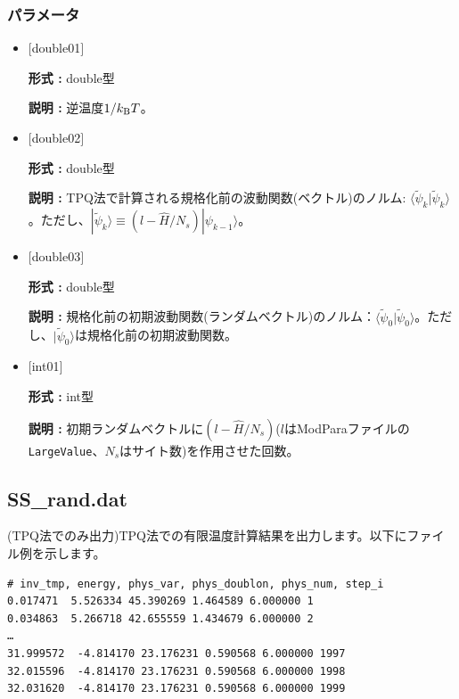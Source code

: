 \subsubsection{パラメータ}
 \begin{itemize}

  \item  $[$double01$]$
  
 {\bf 形式 :} double型

{\bf 説明 :} 逆温度$1/{k_{\rm B}T}$。
 
  \item $[$double02$]$

 {\bf 形式 :} double型 

{\bf 説明 :}  TPQ法で計算される規格化前の波動関数(ベクトル)のノルム:
 $\langle \tilde{\psi}_{k} |\tilde{\psi}_{k}\rangle$。ただし、$|\tilde{\psi}_{k}\rangle \equiv(l-\hat{H}/N_{s})|\psi_{k-1}\rangle$。

  \item $[$double03$]$

 {\bf 形式 :} double型 

{\bf 説明 :} 規格化前の初期波動関数(ランダムベクトル)のノルム：$\langle \tilde{\psi}_{0} |\tilde{\psi}_{0}\rangle$。ただし、$|\tilde{\psi}_{0}\rangle$は規格化前の初期波動関数。

  \item $[$int01$]$

 {\bf 形式 :} int型 

{\bf 説明 :} 初期ランダムベクトルに$(l-\hat{H}/N_{s})$($l$はModParaファイルの\verb|LargeValue|、$N_{s}$はサイト数)を作用させた回数。

 \end{itemize}


\newpage
\subsection{SS\_rand.dat}
\label{Subsec:ssrand}
(TPQ法でのみ出力)TPQ法での有限温度計算結果を出力します。以下にファイル例を示します。\\
\begin{minipage}{15cm}
\begin{screen}
\begin{verbatim}
# inv_tmp, energy, phys_var, phys_doublon, phys_num, step_i
0.017471  5.526334 45.390269 1.464589 6.000000 1
0.034863  5.266718 42.655559 1.434679 6.000000 2
…
31.999572  -4.814170 23.176231 0.590568 6.000000 1997
32.015596  -4.814170 23.176231 0.590568 6.000000 1998
32.031620  -4.814170 23.176231 0.590568 6.000000 1999
\end{verbatim}
\end{screen}
\end{minipage}

